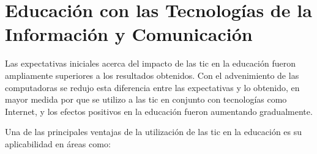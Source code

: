 \section[Educación con TIC's]{Educación con las Tecnologías de la Información y
    Comunicación}
\label{sec:tics_educacion}

Las expectativas iniciales acerca del impacto de las \Gls{tic} en la educación
fueron ampliamente superiores a los resultados obtenidos\cite{unesco:ict}. Con
el advenimiento de las computadoras se redujo esta diferencia entre las
expectativas  y lo obtenido, en mayor medida por que se utilizo a las \Gls{tic}
en conjunto con  tecnologías como Internet, y los efectos positivos en la
educación fueron aumentando gradualmente\cite{unesco:ict}.

Una de las principales ventajas de la utilización de las \Gls{tic} en la
educación es su aplicabilidad en áreas como:

